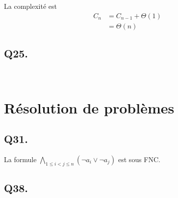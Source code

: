 	La complexité est
	\begin{align*}
		C_n &= C_{n-1} + \Theta(1)\\
		&= \Theta(n)
	\end{align*}
	
	\subsection*{Q25.}~
	
	\section{Résolution de problèmes}
	\subsection*{Q31.}
	La formule $\bigwedge\limits_{1 \leq i < j \leq n}(\lnot a_i \vee \lnot a_j)$ est sous FNC.
	
	\subsection*{Q38.}~
	
